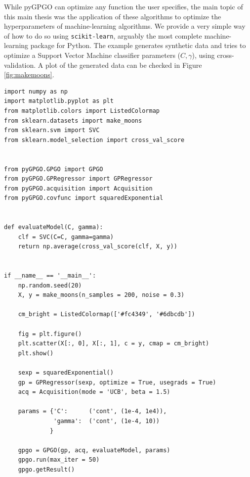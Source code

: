 \documentclass[10pt,a4paper,twoside]{book}
\begin{document}
While pyGPGO can optimize any function the user specifies, the main topic of this main thesis was the application of these algorithms to optimize the hyperparameters of machine-learning algorithms. We provide a very simple way of how to do so using \texttt{scikit-learn}, arguably the most complete machine-learning package for Python. The example generates synthetic data and tries to optimize a Support Vector Machine classifier parameters ($C, \gamma$), using cross-validation. A plot of the generated data can be checked in Figure \ref{fig:makemoons}.\\

\begin{verbatim}
import numpy as np
import matplotlib.pyplot as plt
from matplotlib.colors import ListedColormap
from sklearn.datasets import make_moons
from sklearn.svm import SVC
from sklearn.model_selection import cross_val_score


from pyGPGO.GPGO import GPGO
from pyGPGO.GPRegressor import GPRegressor
from pyGPGO.acquisition import Acquisition
from pyGPGO.covfunc import squaredExponential


def evaluateModel(C, gamma):
    clf = SVC(C=C, gamma=gamma)
    return np.average(cross_val_score(clf, X, y))
    

if __name__ == '__main__':
    np.random.seed(20)
    X, y = make_moons(n_samples = 200, noise = 0.3)

    cm_bright = ListedColormap(['#fc4349', '#6dbcdb'])
    
    fig = plt.figure()
    plt.scatter(X[:, 0], X[:, 1], c = y, cmap = cm_bright)
    plt.show()
    
    sexp = squaredExponential()
    gp = GPRegressor(sexp, optimize = True, usegrads = True)
    acq = Acquisition(mode = 'UCB', beta = 1.5)

    params = {'C':      ('cont', (1e-4, 1e4)),
              'gamma':  ('cont', (1e-4, 10))
             }

    gpgo = GPGO(gp, acq, evaluateModel, params)
    gpgo.run(max_iter = 50)
    gpgo.getResult()               
\end{verbatim}
\end{document}
